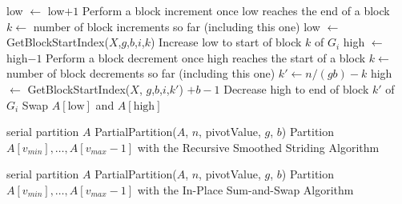\documentclass[11pt]{article}
\theoremstyle{remark}
\theoremstyle{remark}
\begin{document}
\begin{figure*}[h]
\begin{algorithmic}
            \State low $\gets$ low$+1$
              \Comment Perform a block increment once low reaches the end of a block
              \State $k \gets $ number of block increments so far (including this one)
              \State low $\gets$ GetBlockStartIndex($X$,$g$,$b$,$i$,$k$)
              \Comment Increase low to start of block $k$ of $G_i$
            \EndIf
          \EndWhile
            \State high $\gets$ high$-1$
              \Comment Perform a block decrement once high reaches the start of a block
              \State $k \gets $ number of block decrements so far (including this one)
              \State $k' \gets n/(gb) - k$
              \State high $\gets$ GetBlockStartIndex($X$, $g$,$b$,$i$,$k'$) $+b-1$
              \Comment Decrease high to end of block $k'$ of $G_i$
            \EndIf
          \EndWhile
          \State Swap $A[\text{low}]$ and $A[\text{high}]$
        \EndWhile
      \EndFor
    \EndProcedure
    \State

        \State serial partition $A$
      \Else
        \State PartialPartition($A$, $n$, pivotValue, $g$, $b$)
        \State Partition $A[v_{min}],\ldots,A[v_{max}-1]$ with the Recursive Smoothed Striding Algorithm
      \EndIf
    \EndProcedure
    \State

        \State serial partition $A$
      \Else
        \State PartialPartition($A$, $n$, pivotValue, $g$, $b$)
        \State Partition $A[v_{min}],\ldots,A[v_{max}-1]$ with the In-Place Sum-and-Swap Algorithm
      \EndIf
    \EndProcedure

	\end{algorithmic}	
\end{figure*}
\end{document}
